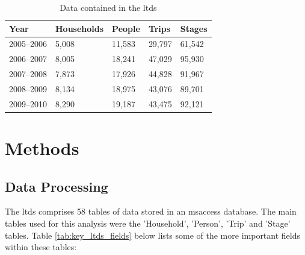 \begin{table}[H]
    \caption{Data contained in the \gls{ltds}}
    \begin{tabular}{ | p{2.2cm} | p{2.2cm} | p{2.2cm} | p{2.2cm} | p{2.2cm} |}
    \hline
    \textbf{Year} & \textbf{Households} & \textbf{People} & \textbf{Trips} & \textbf{Stages} \\ \hline
    2005--2006 & 5,008 & 11,583 & 29,797 & 61,542 \\ \hline
    2006--2007 & 8,005 & 18,241 & 47,029 & 95,930 \\ \hline
    2007--2008 & 7,873 & 17,926 & 44,828 & 91,967 \\ \hline
    2008--2009 & 8,134 & 18,975 & 43,076 & 89,701 \\ \hline
    2009--2010 & 8,290 & 19,187 & 43,475 & 92,121 \\ \hline
    \end{tabular}
    \label{tab:ltds_data}
\end{table}

\section{Methods}
\label{sec:1_methods}

\subsection{Data Processing}
\label{sec:reconstruction_data_processing}

The \gls{ltds} comprises 58 tables of data stored in an \gls{msaccess} database. The main tables used for this analysis were the 'Household', 'Person', 'Trip' and 'Stage' tables. Table \ref{tab:key_ltds_fields} below lists some of the more important fields within these tables:

\newpage

